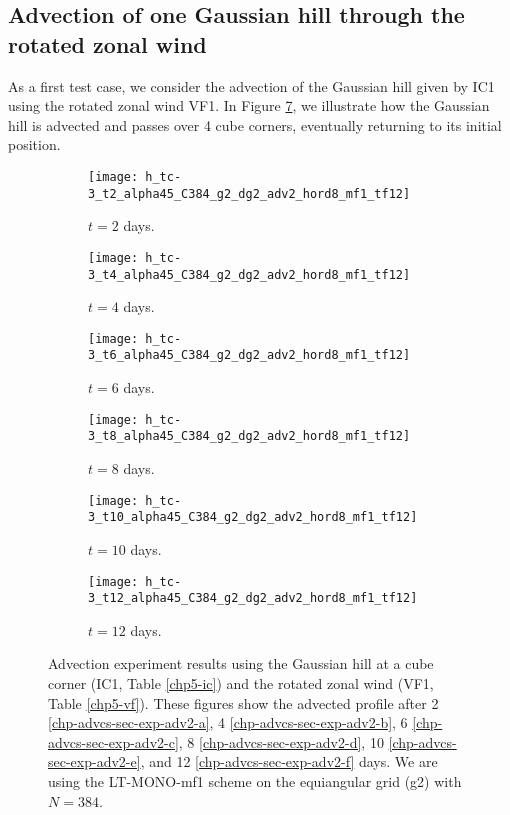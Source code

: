 \subsection{Advection of one Gaussian hill through the rotated zonal wind}
As a first test case, we consider the advection of the Gaussian hill given by IC1 using 
the rotated zonal wind VF1.
In Figure \ref{chp-advcs-sec-exp-adv2}, we illustrate how the Gaussian hill is advected and passes over 4 cube corners, 
eventually returning to its initial position. 
\begin{figure}[!htb]
	\centering
	\begin{subfigure}{0.45\textwidth}
		\centering
		\texttt{[image: h\_tc-3\_t2\_alpha45\_C384\_g2\_dg2\_adv2\_hord8\_mf1\_tf12]}
		\caption{$t=2$ days.\label{chp-advcs-sec-exp-adv2-a}}
	\end{subfigure}
	\begin{subfigure}{0.45\textwidth}
		\centering
		\texttt{[image: h\_tc-3\_t4\_alpha45\_C384\_g2\_dg2\_adv2\_hord8\_mf1\_tf12]}
		\caption{$t=4$ days.\label{chp-advcs-sec-exp-adv2-b}}
	\end{subfigure}

	\begin{subfigure}{0.45\textwidth}
		\centering
		\texttt{[image: h\_tc-3\_t6\_alpha45\_C384\_g2\_dg2\_adv2\_hord8\_mf1\_tf12]}
		\caption{$t=6$ days.\label{chp-advcs-sec-exp-adv2-c}}
	\end{subfigure}	
	\begin{subfigure}{0.45\textwidth}
		\centering
		\texttt{[image: h\_tc-3\_t8\_alpha45\_C384\_g2\_dg2\_adv2\_hord8\_mf1\_tf12]}
		\caption{$t=8$ days.\label{chp-advcs-sec-exp-adv2-d}}
	\end{subfigure}

	\begin{subfigure}{0.45\textwidth}
		\centering
		\texttt{[image: h\_tc-3\_t10\_alpha45\_C384\_g2\_dg2\_adv2\_hord8\_mf1\_tf12]}
		\caption{$t=10$ days.\label{chp-advcs-sec-exp-adv2-e}}
	\end{subfigure}
	\begin{subfigure}{0.45\textwidth}
		\centering
		\texttt{[image: h\_tc-3\_t12\_alpha45\_C384\_g2\_dg2\_adv2\_hord8\_mf1\_tf12]}
		\caption{$t=12$ days.\label{chp-advcs-sec-exp-adv2-f}}
	\end{subfigure}
	\caption{Advection experiment results using the Gaussian hill at a cube corner (IC1, Table \ref{chp5-ic}) and 
		the rotated zonal wind (VF1, Table \ref{chp5-vf}).
		These figures show the advected profile after
		2 \eqref{chp-advcs-sec-exp-adv2-a}, 
		4  \eqref{chp-advcs-sec-exp-adv2-b},
		6  \eqref{chp-advcs-sec-exp-adv2-c},
		8  \eqref{chp-advcs-sec-exp-adv2-d},
		10  \eqref{chp-advcs-sec-exp-adv2-e},
		and 12  \eqref{chp-advcs-sec-exp-adv2-f} days.
		We are using the LT-MONO-mf1 scheme on the equiangular grid (g2) with $N=384$. \label{chp-advcs-sec-exp-adv2}}
\end{figure}

